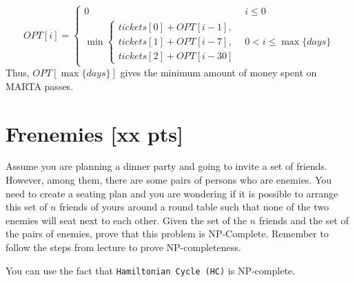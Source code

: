 \documentclass{article}
\begin{document}
$$
 OPT[i] =
    \begin{cases}
      0 & i \leq 0\\
      \min 
      \begin{cases}
      	tickets[0] + OPT[i-1], \\
      	tickets[1] + OPT[i-7] ,\\
      	tickets[2] + OPT[i-30]
      \end{cases} 
       & 0 < i \leq \max\{days\}
    \end{cases} 
$$
Thus, $OPT[\max\{days\}]$ gives the minimum amount of money spent on MARTA passes.

\color{black}
\section{Frenemies [xx pts]} 

Assume you are planning a dinner party and going to invite a set of friends. However, among them, there are some pairs of persons who are enemies. You need to create a seating plan and you are wondering if it is possible to arrange this set of $n$ friends of yours around a round table such that none of the two enemies will seat next to each other. Given the set of the $n$ friends and the set of the pairs of enemies, prove that this problem is NP-Complete. Remember to follow the steps from lecture to prove NP-completeness.

You can use the fact that \texttt{Hamiltonian Cycle (HC)} is NP-complete.

\color{blue}
\end{document}
